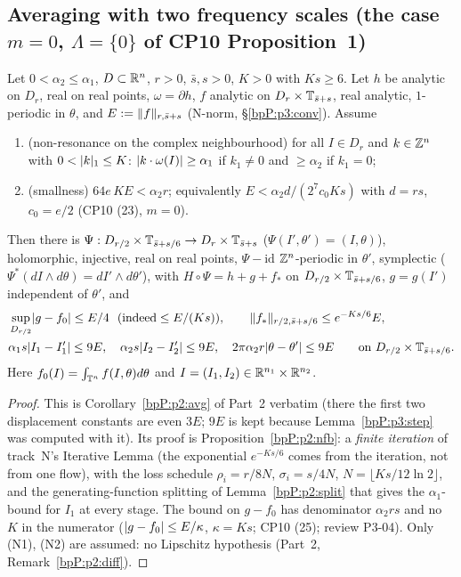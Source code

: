 \subsection{Averaging with two frequency scales (the case $m=0$, $\Lambda=\{0\}$ of CP10 Proposition~1)}\label{bpP:p3:avgsec}

\begin{lemma}\label{bpP:p3:avg}
Let $0<\alpha_2\le\alpha_1$, $D\subset\mathbb{R}^n$, $r>0$, $\bar s,s>0$, $K>0$ with $Ks\ge6$. Let $h$ be analytic on $D_r$, real on real points, $\omega=\partial h$, $f$ analytic on $D_r\times\mathbb{T}_{\bar s+s}$, real analytic, $1$-periodic in $\theta$, and $E:=\lVert f\rVert_{r,\bar s+s}$ (N-norm, \S\ref{bpP:p3:conv}). Assume
\begin{enumerate}[label=(N\arabic*)]
\item (non-resonance on the complex neighbourhood) for all $I\in D_r$ and $k\in\mathbb{Z}^n$ with $0<\lvert k\rvert_1\le K$: $\lvert k\cdot\omega(I)\rvert\ge\alpha_1$ if $k_1\ne0$ and $\ge\alpha_2$ if $k_1=0$;
\item (smallness) $64e\,KE<\alpha_2r$; equivalently $E<\alpha_2d/(2^7c_0Ks)$ with $d=rs$, $c_0=e/2$ (CP10 (23), $m=0$).
\end{enumerate}
Then there is $\Psi:D_{r/2}\times\mathbb{T}_{\bar s+s/6}\to D_r\times\mathbb{T}_{\bar s+s}$ ($\Psi(I',\theta')=(I,\theta)$), holomorphic, injective, real on real points, $\Psi-\mathrm{id}$ $\mathbb{Z}^n$-periodic in $\theta'$, symplectic ($\Psi^*(dI\wedge d\theta)=dI'\wedge d\theta'$), with $H\circ\Psi=h+g+f_*$ on $D_{r/2}\times\mathbb{T}_{\bar s+s/6}$, $g=g(I')$ independent of $\theta'$, and
\begin{align*}
&\sup_{D_{r/2}}\lvert g-f_0\rvert\le E/4\ \ (\text{indeed}\le E/(Ks)),\qquad \lVert f_*\rVert_{r/2,\bar s+s/6}\le e^{-Ks/6}E,\\
&\alpha_1s\lvert I_1-I'_1\rvert\le9E,\quad\alpha_2s\lvert I_2-I'_2\rvert\le9E,\quad2\pi\alpha_2r\lvert \theta-\theta'\rvert\le9E\qquad\text{on }D_{r/2}\times\mathbb{T}_{\bar s+s/6}.
\end{align*}
Here $f_0(I)=\int_{\mathbb{T}^n}f(I,\theta)d\theta$ and $I=(I_1,I_2)\in\mathbb{R}^{n_1}\times\mathbb{R}^{n_2}$.
\end{lemma}
\begin{proof}
This is Corollary~\ref{bpP:p2:avg} of Part~2 verbatim (there the first two displacement constants are even $3E$; $9E$ is kept because Lemma~\ref{bpP:p3:step} was computed with it). Its proof is Proposition~\ref{bpP:p2:nfb}: a \emph{finite iteration} of track~N's Iterative Lemma (the exponential $e^{-Ks/6}$ comes from the iteration, not from one flow), with the loss schedule $\rho_i=r/8N$, $\sigma_i=s/4N$, $N=\lfloor Ks/12\ln2\rfloor$, and the generating-function splitting of Lemma~\ref{bpP:p2:split} that gives the $\alpha_1$-bound for $I_1$ at every stage. The bound on $g-f_0$ has denominator $\alpha_2rs$ and no $K$ in the numerator ($\lvert g-f_0\rvert\le E/\kappa$, $\kappa=Ks$; CP10 (25); review P3-04). Only (N1), (N2) are assumed: no Lipschitz hypothesis (Part~2, Remark~\ref{bpP:p2:diff}).
\end{proof}

